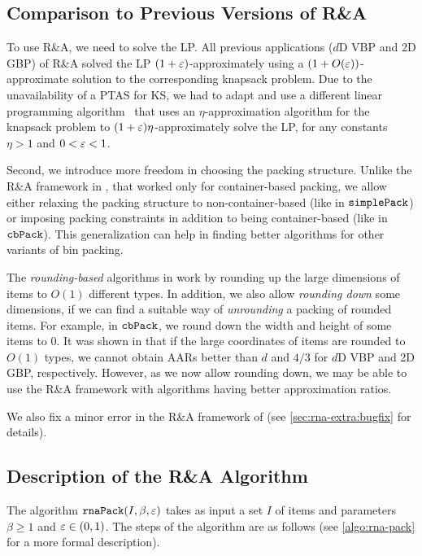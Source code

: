 \subsection{Comparison to Previous Versions of R\&A}
\label{sec:rna:old-compare}

To use R\&A, we need to solve the \config{} LP.
All previous applications ($d$D VBP and 2D GBP) of R\&A solved the \config{} LP
$(1+\varepsilon)$-approximately using a $(1+O(\varepsilon))$-approximate solution to
the corresponding knapsack problem.
Due to the unavailability of a PTAS for  KS,
we had to adapt and use a different linear programming algorithm~\cite{eku-pst}
that uses an $\eta$-approximation algorithm for the knapsack problem to
$(1+\varepsilon)\eta$-approximately solve the \config{} LP,
for any constants $\eta > 1$ and $0 < \varepsilon < 1$.

Second, we introduce more freedom in choosing the packing structure.
Unlike the R\&A framework in \cite{bansal2014binpacking},
that worked only for container-based packing,
we allow either relaxing the packing structure to non-container-based (like in $\operatorname{\mathtt{simplePack}}$)
or imposing packing constraints in addition to being container-based (like in $\operatorname{\mathtt{cbPack}}$).
This generalization can help in finding better algorithms for other variants of bin packing.

The \emph{rounding-based} algorithms in \cite{bansal2014binpacking}
work by rounding up the large dimensions of items to $O(1)$ different types.
In addition, we also allow \emph{rounding down} some dimensions, if we can find
a suitable way of \emph{unrounding} a packing of rounded items.
For example, in $\operatorname{\mathtt{cbPack}}$, we round down the width and height of some items to 0.
It was shown in \cite{khan-thesis} that if the large coordinates of items are
rounded to $O(1)$ types, we cannot obtain AARs better than $d$ and $4/3$
for $d$D VBP and 2D GBP, respectively.
However, as we now allow rounding down, we may be able to use the R\&A framework
with algorithms having better approximation ratios.

We also fix a minor error in the R\&A framework of \cite{bansal2014binpacking}
(see \cref{sec:rna-extra:bugfix} for details).

\subsection{Description of the R\&A Algorithm}
\label{sec:rna:algo}

The algorithm $\operatorname{\mathtt{rnaPack}}(I, \beta, \varepsilon)$
takes as input a set $I$ of  items
and parameters $\beta \ge 1$ and $\varepsilon \in (0, 1)$.
The steps of the algorithm are as follows
(see \cref{algo:rna-pack} for a more formal description).

